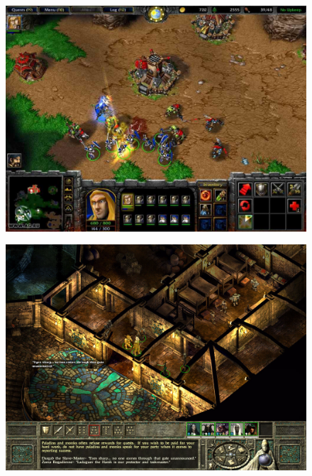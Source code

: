  \begin{figure}[h]
  \centering
  \begin{minipage}{0.47\columnwidth}
	\label{fig:wc3}
	\centering
		\includegraphics[width=\columnwidth]{diagrams/wc3.pdf}
	\end{minipage}
  \hspace{0.35em}
  \begin{minipage}{0.47\columnwidth}
	\label{fig:iw2}
	\centering
		\includegraphics[width=\columnwidth]{diagrams/iwdale.jpg}
	\end{minipage}
\end{figure}
